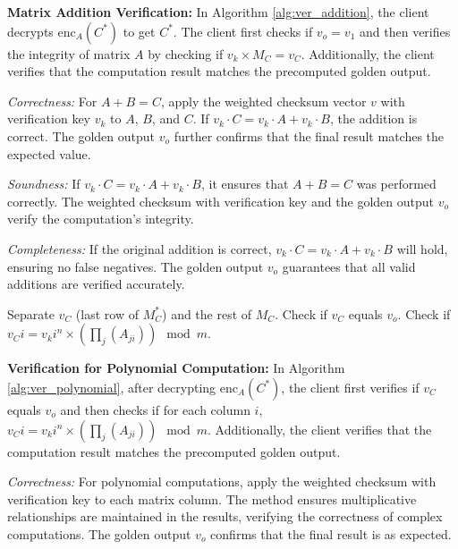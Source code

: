 \noindent\textbf{Matrix Addition Verification:}
In Algorithm \ref{alg:ver_addition}, the client decrypts \(\text{enc}_A(C^*)\) to get \(C^*\). The client first checks if \(v_o = v_1\) and then verifies the integrity of matrix \(A\) by checking if \(v_k \times M_C = v_C\). Additionally, the client verifies that the computation result matches the precomputed golden output.

\textit{Correctness:} For \(A + B = C\), apply the weighted checksum vector \(v\) with verification key \(v_k\) to \(A\), \(B\), and \(C\). If \(v_k \cdot C = v_k \cdot A + v_k \cdot B\), the addition is correct. The golden output \(v_o\) further confirms that the final result matches the expected value.

\textit{Soundness:} If \(v_k \cdot C = v_k \cdot A + v_k \cdot B\), it ensures that \(A + B = C\) was performed correctly. The weighted checksum with verification key and the golden output \(v_o\) verify the computation's integrity.

\textit{Completeness:} If the original addition is correct, \(v_k \cdot C = v_k \cdot A + v_k \cdot B\) will hold, ensuring no false negatives. The golden output \(v_o\) guarantees that all valid additions are verified accurately.

\begin{algorithm}
\caption{Secure Matrix Polynomial Verification}
\label{alg:ver_polynomial}
\begin{algorithmic}[1]
\STATE Separate $v_C$ (last row of $M_C^*$) and the rest of $M_C$.
\STATE Check if $v_C$ equals $v_o$.
\STATE Check if $v_Ci = v_k i^n \times \left( \prod_{j} ( A_{ji}) \right) \mod m$. 
\end{algorithmic}
\end{algorithm}

\noindent\textbf{Verification for Polynomial Computation:}
In Algorithm \ref{alg:ver_polynomial}, after decrypting \(\text{enc}_A(C^*)\), the client first verifies if \(v_C\) equals \(v_o\) and then checks if for each column \(i\), \(v_Ci = v_k i^n \times \left( \prod_{j} ( A_{ji}) \right) \mod m\). Additionally, the client verifies that the computation result matches the precomputed golden output.

\textit{Correctness:} For polynomial computations, apply the weighted checksum with verification key to each matrix column. The method ensures multiplicative relationships are maintained in the results, verifying the correctness of complex computations. The golden output \(v_o\) confirms that the final result is as expected.

